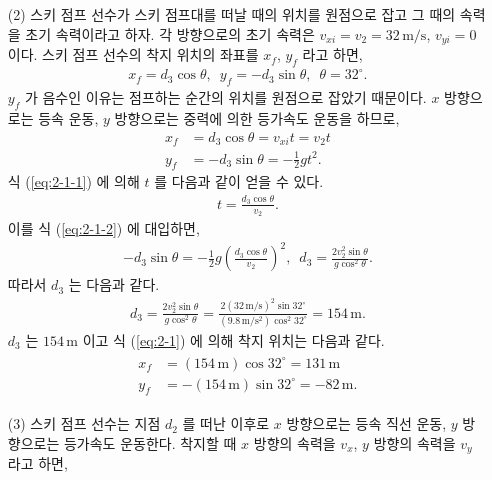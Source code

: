 \documentclass[floatfix,nofootinbib,superscriptaddress,fleqn]{revtex4-2}
\begin{document}
\begin{itemize}
  \item[(2)] 스키 점프 선수가 스키 점프대를 떠날 때의 위치를 원점으로 잡고 
  그 때의 속력을 초기 속력이라고 하자. 각 방향으로의 초기 속력은 
  $v_{xi}=v_2=32\,\mathrm{m/s}$, $v_{yi}=0$ 이다. 
  스키 점프 선수의 착지 위치의 좌표를 $x_f$, $y_f$ 라고 하면,
  \begin{align}\label{eq:2-1}
    x_f = d_3\cos{\theta},\,\,\, y_f 
    = -d_3\sin{\theta},\,\,\,\theta=32^\circ.
  \end{align}
  $y_f$ 가 음수인 이유는 점프하는 순간의 위치를 원점으로 잡았기 때문이다. 
  $x$ 방향으로는 등속 운동, $y$ 방향으로는 중력에 의한 등가속도 운동을 하므로,
  \begin{align}\label{eq:2-1-1}
    x_f &= d_3\cos{\theta} = v_{xi}t = v_2t \\
    \label{eq:2-1-2}
    y_f &= -d_3\sin{\theta}=-\frac{1}{2}gt^2.
  \end{align}
  식 (\ref{eq:2-1-1}) 에 의해 $t$ 를 다음과 같이 얻을 수 있다.  
  \begin{align}\label{eq:2-1-3}
    t = \frac{d_3\cos{\theta}}{v_2}.
  \end{align}
  이를 식 (\ref{eq:2-1-2}) 에 대입하면,
  \begin{align}
    -d_3\sin{\theta}
    =-\frac{1}{2}g\left(\frac{d_3\cos{\theta}}{v_2}\right)^2,\,\,\,
    d_3 = \frac{2v^2_2\sin{\theta}}{g\cos^2{\theta}}.
  \end{align}
  따라서 $d_3$ 는 다음과 같다.
  \begin{align}\label{eq:2-2}
    d_3 = \frac{2v^2_2\sin{\theta}}{g\cos^2{\theta}}
    =\frac{2(32\,\mathrm{m/s})^2\sin{32^\circ}}
    {(9.8\,\mathrm{m/s^2})\cos^2{32^\circ}}
    =154\,\mathrm{m}.
  \end{align}
  $d_3$ 는 $154\,\mathrm{m}$ 이고 식 (\ref{eq:2-1}) 에 의해
   착지 위치는 다음과 같다.
\begin{align}
  \begin{split}\label{eq:2-3}
    x_f &= (154\,\mathrm{m})\cos{32^\circ}=131\,\mathrm{m} \\
    y_f &= -(154\,\mathrm{m})\sin{32^\circ}=-82\,\mathrm{m}.
  \end{split}
\end{align}
  \item[(3)] 스키 점프 선수는 지점 $d_2$ 를 떠난 이후로 $x$ 방향으로는 
  등속 직선 운동, $y$ 방향으로는 등가속도 운동한다. 착지할 때 $x$ 방향의 
  속력을 $v_x$, $y$ 방향의 속력을 $v_y$ 라고 하면,
  \begin{align}
    \begin{split}

\end{split}
\end{align}
\end{itemize}
\end{document}
